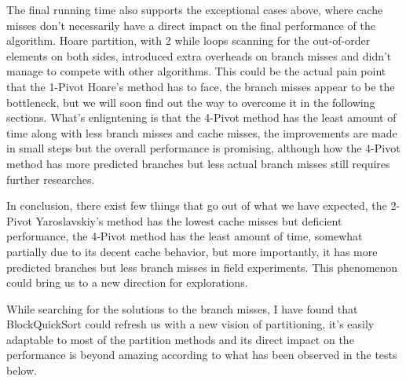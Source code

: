 \documentclass{article}
\begin{document}
The final running time also supports the exceptional cases above, where cache misses don't necessarily have a direct impact on the final performance of the algorithm.
Hoare partition, with 2 while loops scanning for the out-of-order elements on both sides, introduced extra overheads on branch misses and didn't manage to compete with other algorithms.
This could be the actual pain point that the 1-Pivot Hoare's method has to face, the branch misses appear to be the bottleneck, but we will soon find out the way to overcome it in the following sections.
What's enligntening is that the 4-Pivot method has the least amount of time along with less branch misses and cache misses, the improvements are made in small steps but the overall performance is promising,
although how the 4-Pivot method has more predicted branches but less actual branch misses still requires further researches.

In conclusion, there exist few things that go out of what we have expected, the 2-Pivot Yaroslavskiy's method has the lowest cache misses but deficient performance, the 4-Pivot method has the least amount of time,
somewhat partially due to its decent cache behavior, but more importantly, it has more predicted branches but less branch misses in field experiments. This phenomenon could bring us to a new direction for explorations.



While searching for the solutions to the branch misses, I have found that BlockQuickSort could refresh us with a new vision of partitioning, it's easily adaptable to most of the partition methods and its direct impact on the performance is beyond amazing
according to what has been observed in the tests below.
\end{document}

